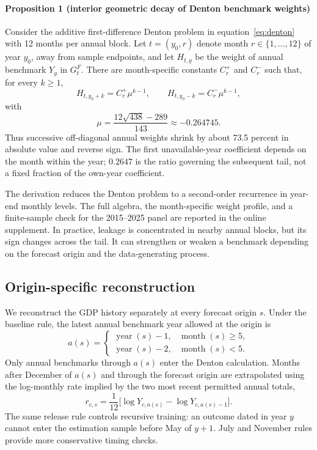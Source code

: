 \documentclass[preprint,12pt,authoryear]{elsarticle}
\begin{document}
\paragraph{Proposition 1 (interior geometric decay of Denton benchmark weights)}
Consider the additive first-difference Denton problem in equation~\eqref{eq:denton} with 12 months per annual block. Let $t=(y_0,r)$ denote month $r\in\{1,\ldots,12\}$ of year $y_0$, away from sample endpoints, and let $H_{t,y}$ be the weight of annual benchmark $Y_y$ in $G^F_t$. There are month-specific constants $C_r^+$ and $C_r^-$ such that, for every $k\geq1$,
\begin{equation}
H_{t,y_0+k}=C_r^+\mu^{k-1},\qquad
H_{t,y_0-k}=C_r^-\mu^{k-1},
\label{eq:denton_tail}
\end{equation}
with
\begin{equation}
\mu=\frac{12\sqrt{438}-289}{143}\approx-0.264745.
\label{eq:denton_mu}
\end{equation}
Thus successive off-diagonal annual weights shrink by about 73.5 percent in absolute value and reverse sign. The first unavailable-year coefficient depends on the month within the year; $0.2647$ is the ratio governing the subsequent tail, not a fixed fraction of the own-year coefficient.

The derivation reduces the Denton problem to a second-order recurrence in year-end monthly levels. The full algebra, the month-specific weight profile, and a finite-sample check for the 2015--2025 panel are reported in the online supplement. In practice, leakage is concentrated in nearby annual blocks, but its sign changes across the tail. It can strengthen or weaken a benchmark depending on the forecast origin and the data-generating process.

\subsection{Origin-specific reconstruction}

We reconstruct the GDP history separately at every forecast origin $s$. Under the baseline rule, the latest annual benchmark year allowed at the origin is
\begin{equation}
a(s)=\begin{cases}
\operatorname{year}(s)-1, & \operatorname{month}(s)\geq5,\\
\operatorname{year}(s)-2, & \operatorname{month}(s)<5.
\end{cases}
\label{eq:availyear}
\end{equation}
Only annual benchmarks through $a(s)$ enter the Denton calculation. Months after December of $a(s)$ and through the forecast origin are extrapolated using the log-monthly rate implied by the two most recent permitted annual totals,
\begin{equation}
r_{c,s}=\frac{1}{12}\bigl[\log Y_{c,a(s)}-\log Y_{c,a(s)-1}\bigr].
\label{eq:extraprate}
\end{equation}
The same release rule controls recursive training: an outcome dated in year $y$ cannot enter the estimation sample before May of $y+1$. July and November rules provide more conservative timing checks.
\end{document}
